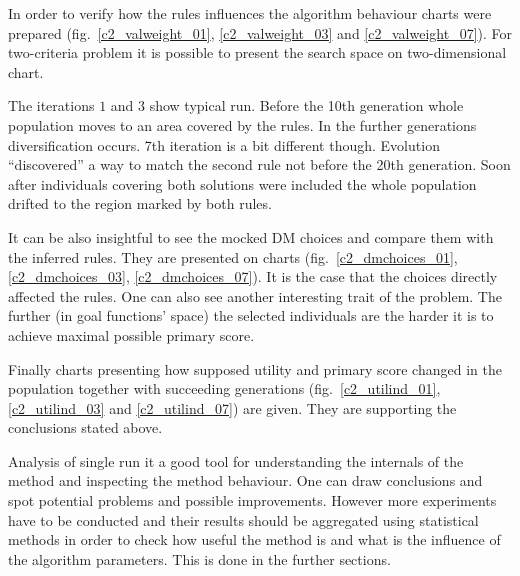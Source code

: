 In order to verify how the rules influences the algorithm behaviour charts
were prepared (fig.~\ref{c2_valweight_01}, \ref{c2_valweight_03} and
\ref{c2_valweight_07}). For two-criteria problem it is possible to present the
search space on two-dimensional chart.

The iterations $1$ and $3$ show typical run. Before the 10th generation whole
population moves to an area covered by the rules. In the further generations
diversification occurs. 7th iteration is a bit different though. Evolution
``discovered'' a way to match the second rule not before the 20th
generation. Soon after individuals covering both solutions were included the
whole population drifted to the region marked by both rules.

It can be also insightful to see the mocked DM choices and compare them with the
inferred  rules. They are presented on charts (fig.~\ref{c2_dmchoices_01},
\ref{c2_dmchoices_03}, \ref{c2_dmchoices_07}). It is the case that the choices
directly affected the rules. One can also see another interesting trait of the
problem. The further (in goal functions' space) the selected individuals are
the harder it is to achieve maximal possible primary score.

Finally charts presenting how supposed utility and primary score changed in
the population together with succeeding generations (fig.~\ref{c2_utilind_01},
\ref{c2_utilind_03} and \ref{c2_utilind_07}) are given. They are supporting
the conclusions stated above.

Analysis of single run it a good tool for understanding the internals of the
method and inspecting the method behaviour. One can draw conclusions and spot
potential problems and possible improvements. However more experiments have to
be conducted and their results should be aggregated using statistical methods
in order to check how useful the method is and what is the influence of the
algorithm parameters. This is done in the further sections.

